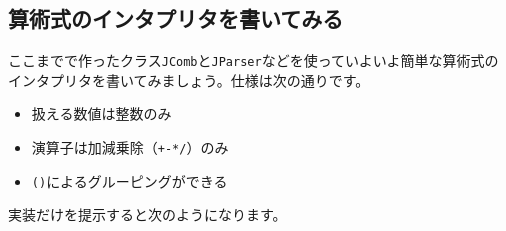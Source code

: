 \hypertarget{chapter6-ux7b97ux8853ux5f0fux306eux30a4ux30f3ux30bfux30d7ux30eaux30bfux3092ux66f8ux3044ux3066ux307fux308b}{%
\subsection{算術式のインタプリタを書いてみる}\label{chapter6-ux7b97ux8853ux5f0fux306eux30a4ux30f3ux30bfux30d7ux30eaux30bfux3092ux66f8ux3044ux3066ux307fux308b}}

ここまでで作ったクラス\texttt{JComb}と\texttt{JParser}などを使っていよいよ簡単な算術式のインタプリタを書いてみましょう。仕様は次の通りです。

\begin{itemize}
\tightlist
\item
  扱える数値は整数のみ
\item
  演算子は加減乗除（\texttt{+\textbar{}-\textbar{}*\textbar{}/}）のみ
\item
  \texttt{()}によるグルーピングができる
\end{itemize}

実装だけを提示すると次のようになります。

